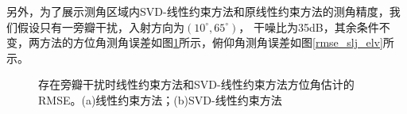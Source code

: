 \documentclass[master]{thesis-uestc}
\begin{document}
另外，为了展示测角区域内SVD-线性约束方法和原线性约束方法的测角精度，我们假设只有一旁瓣干扰，入射方向为$(10^\circ,65^\circ)$，
干噪比为35dB，其余条件不变，两方法的方位角测角误差如图\ref{rmse_slj_azm}所示，俯仰角测角误差如图\ref{rmse_slj_elv}所示。
\begin{figure}[H]
    \caption{存在旁瓣干扰时线性约束方法和SVD-线性约束方法方位角估计的RMSE。(a)线性约束方法；(b)SVD-线性约束方法}
    \label{rmse_slj_azm}
\end{figure}
\end{document}
